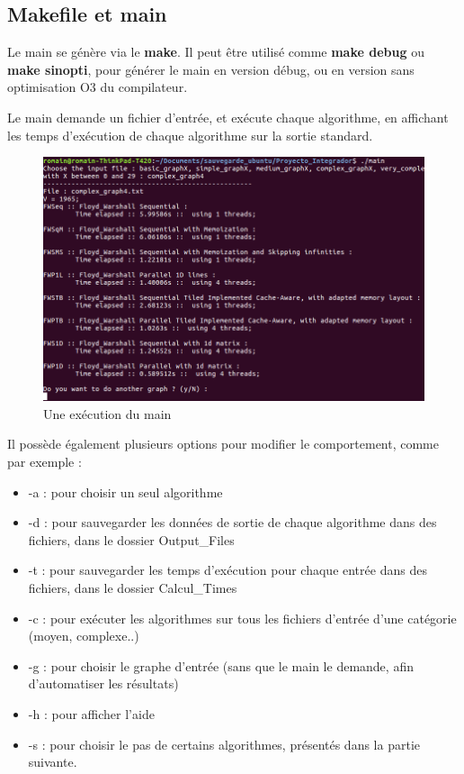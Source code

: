 \documentclass[a4paper,11pt]{article}
\begin{document}
\subsection{Makefile et main}

Le main se génère via le \textbf{make}. Il peut être utilisé comme \textbf{make debug} ou \textbf{make sinopti}, pour générer le main en version débug, ou en version sans optimisation O3 du compilateur.

Le main demande un fichier d'entrée, et exécute chaque algorithme, en affichant les temps d'exécution de chaque algorithme sur la sortie standard.

\begin{figure}[H]
\begin{center}
  \includegraphics[scale=0.7]{main.png}
  \caption{Une exécution du main}
\end{center}
\end{figure}

\noindent Il possède également plusieurs options pour modifier le comportement, comme par exemple :

\begin{itemize}
    \item -a : pour choisir un seul algorithme
    \item -d : pour sauvegarder les données de sortie de chaque algorithme dans des fichiers, dans le dossier Output\_Files
    \item -t : pour sauvegarder les temps d'exécution pour chaque entrée dans des fichiers, dans le dossier Calcul\_Times
    \item -c : pour exécuter les algorithmes sur tous les fichiers d'entrée d'une catégorie (moyen, complexe..)
    \item -g : pour choisir le graphe d'entrée (sans que le main le demande, afin d'automatiser les résultats)
    \item -h : pour afficher l'aide
    \item -s : pour choisir le pas de certains algorithmes, présentés dans la partie suivante.
\end{itemize}
\end{document}
